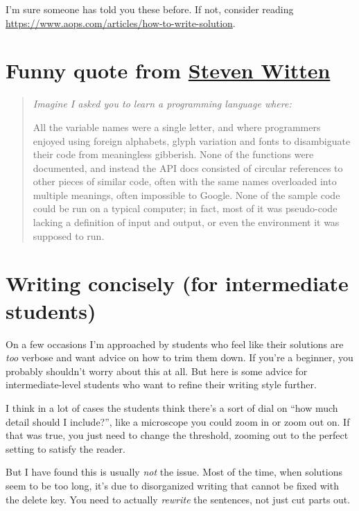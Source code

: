 \documentclass[11pt]{scrartcl}
\begin{document}
I'm sure someone has told you these before.
If not, consider reading
\url{https://www.aops.com/articles/how-to-write-solution}.

\section{Funny quote from \href{https://www.gleech.org/better-maths}{Steven Witten}}
\begin{quote}
  \slshape
  Imagine I asked you to learn a programming language where:
  \begin{itemize}
  \ii All the variable names were a single letter,
  and where programmers enjoyed using foreign alphabets,
  glyph variation and fonts to disambiguate their code from meaningless gibberish.
  \ii None of the functions were documented,
  and instead the API docs consisted of circular references to other pieces of similar code,
  often with the same names overloaded into multiple meanings, often impossible to Google.
  \ii None of the sample code could be run on a typical computer;
  in fact, most of it was pseudo-code lacking a definition of input and output,
  or even the environment it was supposed to run.
  \end{itemize}
\end{quote}

\section{Writing concisely (for intermediate students)}
\renewcommand{\theequation}{\fnsymbol{equation}}
On a few occasions I'm approached by students who feel like their solutions
are \emph{too} verbose and want advice on how to trim them down.
If you're a beginner, you probably shouldn't worry about this at all.
But here is some advice for intermediate-level students
who want to refine their writing style further.

I think in a lot of cases the students think there's a sort of dial on
``how much detail should I include?'',
like a microscope you could zoom in or zoom out on.
If that was true, you just need to change the threshold,
zooming out to the perfect setting to satisfy the reader.

But I have found this is usually \emph{not} the issue.
Most of the time, when solutions seem to be too long,
\alert{it's due to disorganized writing that cannot be fixed with the delete key}.
You need to actually \emph{rewrite} the sentences, not just cut parts out.
\end{document}

